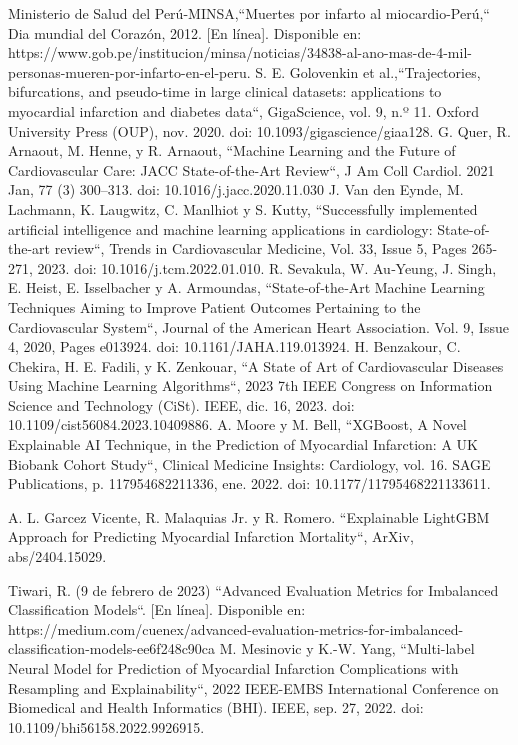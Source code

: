 \documentclass[conference]{IEEEtran}
\begin{document}
\begin{thebibliography}{00}
 Ministerio de Salud del Perú-MINSA,``Muertes por infarto al miocardio-Perú,`` Dia mundial del Corazón, 2012. [En línea]. Disponible en: https://www.gob.pe/institucion/minsa/noticias/34838-al-ano-mas-de-4-mil-personas-mueren-por-infarto-en-el-peru.
  S. E. Golovenkin et al.,``Trajectories, bifurcations, and pseudo-time in large clinical datasets: applications to myocardial infarction and diabetes data``, GigaScience, vol. 9, n.º 11. Oxford University Press (OUP), nov. 2020. doi: 10.1093/gigascience/giaa128.
 G. Quer, R. Arnaout, M. Henne, y R. Arnaout, ``Machine Learning and the Future of Cardiovascular Care: JACC State-of-the-Art Review``, J Am Coll Cardiol. 2021 Jan, 77 (3) 300–313. doi: 10.1016/j.jacc.2020.11.030
 J. Van den Eynde, M. Lachmann, K. Laugwitz, C. Manlhiot y S. Kutty, ``Successfully implemented artificial intelligence and machine learning applications in cardiology: State-of-the-art review``, Trends in Cardiovascular Medicine, Vol. 33, Issue 5, Pages 265-271, 2023. doi: 10.1016/j.tcm.2022.01.010.
 R. Sevakula, W. Au‐Yeung, J. Singh, E. Heist, E. Isselbacher y A. Armoundas, ``State‐of‐the‐Art Machine Learning Techniques Aiming to Improve Patient Outcomes Pertaining to the Cardiovascular System``, Journal of the American Heart Association. Vol. 9, Issue 4, 2020, Pages e013924. doi: 10.1161/JAHA.119.013924.
 H. Benzakour, C. Chekira, H. E. Fadili, y K. Zenkouar, ``A State of Art of Cardiovascular Diseases Using Machine Learning Algorithms``, 2023 7th IEEE Congress on Information Science and Technology (CiSt). IEEE, dic. 16, 2023. doi: 10.1109/cist56084.2023.10409886.
  A. Moore y M. Bell, ``XGBoost, A Novel Explainable AI Technique, in the Prediction of Myocardial Infarction: A UK Biobank Cohort Study``, Clinical Medicine Insights: Cardiology, vol. 16. SAGE Publications, p. 117954682211336, ene. 2022. doi: 10.1177/11795468221133611.


 A. L. Garcez Vicente, R. Malaquias Jr. y R. Romero. ``Explainable LightGBM Approach for Predicting Myocardial Infarction Mortality``, ArXiv, abs/2404.15029.

 Tiwari, R. (9 de febrero de 2023) ``Advanced Evaluation Metrics for Imbalanced Classification Models``. [En línea]. Disponible en: https://medium.com/cuenex/advanced-evaluation-metrics-for-imbalanced-classification-models-ee6f248c90ca
 M. Mesinovic y K.-W. Yang, ``Multi-label Neural Model for Prediction of Myocardial Infarction Complications with Resampling and Explainability``, 2022 IEEE-EMBS International Conference on Biomedical and Health Informatics (BHI). IEEE, sep. 27, 2022. doi: 10.1109/bhi56158.2022.9926915.




\end{thebibliography}
\end{document}
